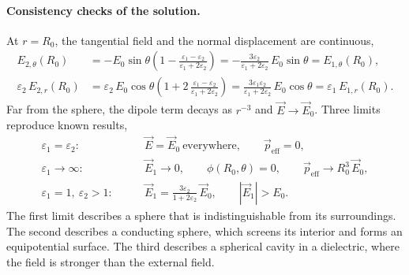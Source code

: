\paragraph{Consistency checks of the solution.}
At $r = R_0$, the tangential field and the normal displacement are continuous,
\begin{align*}
    E_{2,\theta}(R_0) &= -E_0\sin\theta\left(1 - \frac{\varepsilon_1 - \varepsilon_2}{\varepsilon_1 + 2\varepsilon_2}\right)
    = -\frac{3\varepsilon_2}{\varepsilon_1 + 2\varepsilon_2}\,E_0\sin\theta = E_{1,\theta}(R_0),\\
    \varepsilon_2\,E_{2,r}(R_0) &= \varepsilon_2\,E_0\cos\theta\left(1 + 2\,\frac{\varepsilon_1 - \varepsilon_2}{\varepsilon_1 + 2\varepsilon_2}\right)
    = \frac{3\varepsilon_1\varepsilon_2}{\varepsilon_1 + 2\varepsilon_2}\,E_0\cos\theta = \varepsilon_1\,E_{1,r}(R_0).
\end{align*}
Far from the sphere, the dipole term decays as $r^{-3}$ and $\vec E \to \vec E_0$. Three limits reproduce known results,
\begin{align*}
    \varepsilon_1 = \varepsilon_2: &\qquad \vec E = \vec E_0 \ \text{everywhere}, \qquad \vec p_{\text{eff}} = 0,\\
    \varepsilon_1 \to \infty: &\qquad \vec E_1 \to 0, \qquad \phi(R_0,\theta) = 0, \qquad \vec p_{\text{eff}} \to R_0^3\,\vec E_0,\\
    \varepsilon_1 = 1,\ \varepsilon_2 > 1: &\qquad \vec E_1 = \frac{3\varepsilon_2}{1 + 2\varepsilon_2}\,\vec E_0, \qquad |\vec E_1| > E_0.
\end{align*}
The first limit describes a sphere that is indistinguishable from its surroundings. The second describes a conducting sphere, which screens its interior and forms an equipotential surface. The third describes a spherical cavity in a dielectric, where the field is stronger than the external field.

